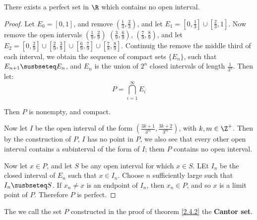 \begin{theorem}\label{2.4.2}
  There exists a perfect set in $\R$ which contains no open interval.
\end{theorem}
\begin{proof}
  Let $E_0=[0,1]$, and remove  $(\frac{1}{3},\frac{2}{3})$, and let $E_1=[0,\frac{1}{3}] \cup
  [\frac{2}{3},1]$. Now remove the open intervals $(\frac{1}{9}, \frac{2}{9})$ $(\frac{3}{9}, \frac{6}{9})$,
  $(\frac{7}{9}, \frac{8}{9})$,  and let $E_2=[0, \frac{2}{9}] \cup [\frac{2}{9}, \frac{3}{9}]
  \cup [\frac{6}{9}, \frac{7}{9}] \cup [\frac{7}{8}, \frac{8}{9}]$. Continuig the remove
  the middle third of each interval, we obtain the sequence of compact sets $\{E_n\}$,
  such that  $E_{n+1} \susbseteq E_n$, and $E_n$ is the union of  $2^n$  closed intervals
  of length $ \frac{1}{3^n}$. Then let:
  \begin{equation}\label{eq_2.1}
    P=\bigcap_{i=1}^{\infty}{E_i}
  \end{equation}

  Then $P$ is nonempty, and compact.

  Now let  $I$ be the open interval of the form  $(\frac{3k+1}{3^m},\frac{3k+2}{3^m})$,
  with $k,m \in \Z^+$. Then by the construction of  $P$,  $I$ has no point in  $P$, we
  also see that every other open interval contains a subinterval of the form of  $I$;
  them  $P$ contains no open interval.

  Now let  $x \in P$, and let  $S$ be any open interval for which  $x \in S$. LEt  $I_n$ be
  the closed interval of  $E_n$ such that  $x \in I_n$. Choose  $n$ sufficiently large
  such that $I_n \susbseteq S$. If  $x_n \neq x$ is an endpoint of  $I_n$, then  $x_n \in P$,
  and so  $x$ is a limit point of  $P$. Therefore  $P$ is perfect.
\end{proof}

\begin{definition}
  The we call the set $P$ constructed in the proof of theorem \ref{2.4.2} the
  \textbf{Cantor set}.
\end{definition}
